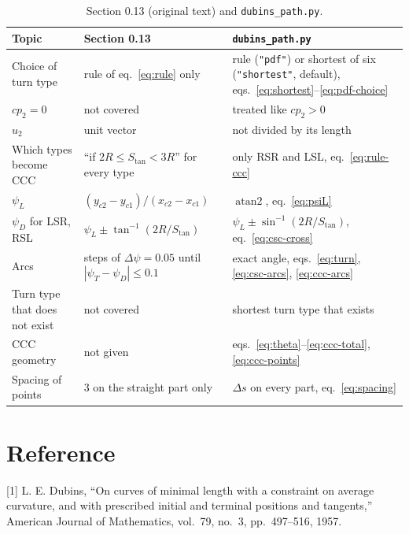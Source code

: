 \documentclass[10pt]{article}
\newcommand{\code}[1]{\texttt{#1}}
\newcommand{\Stan}{S_{\tan}}
\begin{document}
\begin{table}[!htb]
\centering
\small
\caption{Section 0.13 (original text) and \code{dubins\_path.py}.}
\label{tab:paper}
\begin{tabular}{@{}>{\raggedright}p{} >{\raggedright}p{} >{\raggedright\arraybackslash}p{}@{}}
\toprule
Topic & Section 0.13 & \code{dubins\_path.py} \\
\midrule
Choice of turn type & rule of eq.~\eqref{eq:rule} only & rule (\code{"pdf"}) or shortest of six (\code{"shortest"}, default), eqs.~\eqref{eq:shortest}--\eqref{eq:pdf-choice} \\
$cp_2 = 0$ & not covered & treated like $cp_2 > 0$ \\
$u_2$ & unit vector & not divided by its length \\
Which types become CCC & ``if $2R \le \Stan < 3R$'' for every type & only RSR and LSL, eq.~\eqref{eq:rule-ccc} \\
$\psi_L$ & $(y_{c2} - y_{c1}) / (x_{c2} - x_{c1})$ & $\operatorname{atan2}$, eq.~\eqref{eq:psiL} \\
$\psi_D$ for LSR, RSL & $\psi_L \pm \tan^{-1}(2R / \Stan)$ & $\psi_L \pm \sin^{-1}(2R / \Stan)$, eq.~\eqref{eq:csc-cross} \\
Arcs & steps of $\Delta\psi = 0.05$ until $|\psi_T - \psi_D| \le 0.1$ & exact angle, eqs.~\eqref{eq:turn}, \eqref{eq:csc-arcs}, \eqref{eq:ccc-arcs} \\
Turn type that does not exist & not covered & shortest turn type that exists \\
CCC geometry & not given & eqs.~\eqref{eq:theta}--\eqref{eq:ccc-total}, \eqref{eq:ccc-points} \\
Spacing of points & 3 on the straight part only & $\Delta s$ on every part, eq.~\eqref{eq:spacing} \\
\bottomrule
\end{tabular}
\end{table}

\section*{Reference}

[1] L. E. Dubins, ``On curves of minimal length with a constraint on average curvature, and with prescribed initial
and terminal positions and tangents,'' American Journal of Mathematics, vol.~79, no.~3, pp.~497--516, 1957.
\end{document}
